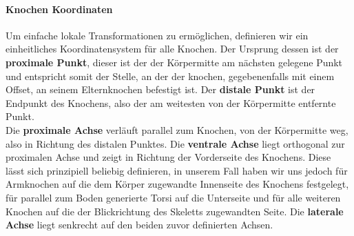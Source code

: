 \paragraph{Knochen Koordinaten}
Um einfache lokale Transformationen zu ermöglichen, definieren wir ein einheitliches Koordinatensystem für alle Knochen. Der Ursprung dessen ist der \textbf{proximale Punkt}, dieser ist der der Körpermitte am nächsten gelegene Punkt und entspricht somit der Stelle, an der der knochen, gegebenenfalls mit einem Offset, an seinem Elternknochen befestigt ist. Der \textbf{distale Punkt} ist der Endpunkt des Knochens, also der am weitesten von der Körpermitte entfernte Punkt. \\ Die \textbf{proximale Achse} verläuft parallel zum Knochen, von der Körpermitte weg, also in Richtung des distalen Punktes. Die \textbf{ventrale Achse} liegt orthogonal zur proximalen Achse und zeigt in Richtung der Vorderseite des Knochens. Diese lässt sich prinzipiell beliebig definieren, in unserem Fall haben wir uns jedoch für Armknochen auf die dem Körper zugewandte Innenseite des Knochens festgelegt, für parallel zum Boden generierte Torsi auf die Unterseite und für alle weiteren Knochen auf die der Blickrichtung des Skeletts zugewandten Seite. Die \textbf{laterale Achse} liegt senkrecht auf den beiden zuvor definierten Achsen.

